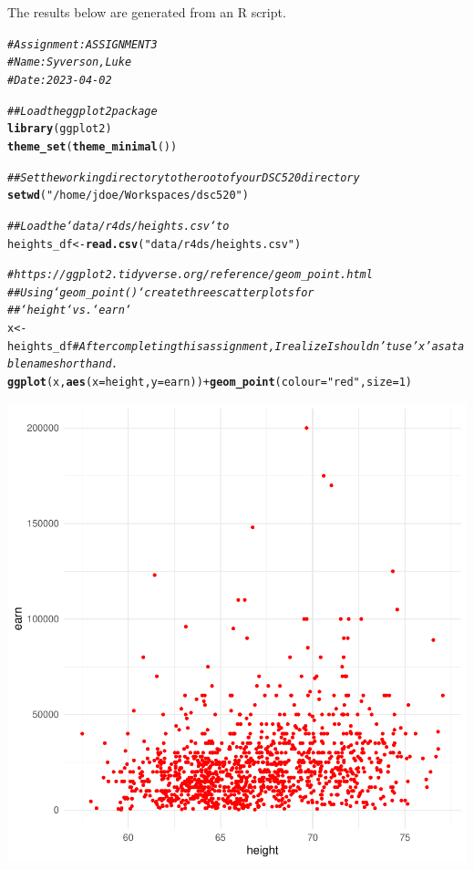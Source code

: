 \documentclass{article}\usepackage[]{graphicx}\usepackage[]{xcolor}
\makeatletter
\newcommand{\hlnum}[1]{\textcolor[rgb]{0.686,0.059,0.569}{#1}}%
\newcommand{\hlstr}[1]{\textcolor[rgb]{0.192,0.494,0.8}{#1}}%
\newcommand{\hlcom}[1]{\textcolor[rgb]{0.678,0.584,0.686}{\textit{#1}}}%
\newcommand{\hlopt}[1]{\textcolor[rgb]{0,0,0}{#1}}%
\newcommand{\hlstd}[1]{\textcolor[rgb]{0.345,0.345,0.345}{#1}}%
\newcommand{\hlkwb}[1]{\textcolor[rgb]{0.69,0.353,0.396}{#1}}%
\newcommand{\hlkwc}[1]{\textcolor[rgb]{0.333,0.667,0.333}{#1}}%
\newcommand{\hlkwd}[1]{\textcolor[rgb]{0.737,0.353,0.396}{\textbf{#1}}}%
\newenvironment{kframe}{%
 \def\at@end@of@kframe{}%
 \ifinner\ifhmode%
  \def\at@end@of@kframe{\end{minipage}}%
  \begin{minipage}{\columnwidth}%
 \fi\fi%
 \def\FrameCommand##1{\hskip\@totalleftmargin \hskip-\fboxsep
 \colorbox{shadecolor}{##1}\hskip-\fboxsep
     \hskip-\linewidth \hskip-\@totalleftmargin \hskip\columnwidth}%
 \MakeFramed {\advance\hsize-\width
   \@totalleftmargin\z@ \linewidth\hsize
   \@setminipage}}%
 {\par\unskip\endMakeFramed%
 \at@end@of@kframe}
\newenvironment{knitrout}{}{} %
\makeatother
\begin{document}
\title{\title{}}



\maketitle
The results below are generated from an R script.

\begin{knitrout}
\color{fgcolor}\begin{kframe}
\begin{alltt}
\hlcom{# Assignment: ASSIGNMENT 3}
\hlcom{# Name: Syverson, Luke}
\hlcom{# Date: 2023-04-02}

\hlcom{## Load the ggplot2 package}
\hlkwd{library}\hlstd{(ggplot2)}
\hlkwd{theme_set}\hlstd{(}\hlkwd{theme_minimal}\hlstd{())}

\hlcom{## Set the working directory to the root of your DSC 520 directory}
\hlkwd{setwd}\hlstd{(}\hlstr{"/home/jdoe/Workspaces/dsc520"}\hlstd{)}
\end{alltt}


{\ttfamily\noindent\bfseries{}}\begin{alltt}
\hlcom{## Load the `data/r4ds/heights.csv` to}
\hlstd{heights_df} \hlkwb{<-} \hlkwd{read.csv}\hlstd{(}\hlstr{"data/r4ds/heights.csv"}\hlstd{)}

\hlcom{# https://ggplot2.tidyverse.org/reference/geom_point.html}
\hlcom{## Using `geom_point()` create three scatterplots for}
\hlcom{## `height` vs. `earn`}
\hlstd{x} \hlkwb{<-} \hlstd{heights_df} \hlcom{# After completing this assignment, I realize I shouldn't use 'x' as a table name shorthand.}
\hlkwd{ggplot}\hlstd{(x,} \hlkwd{aes}\hlstd{(}\hlkwc{x}\hlstd{=height,} \hlkwc{y}\hlstd{=earn))} \hlopt{+} \hlkwd{geom_point}\hlstd{(}\hlkwc{colour} \hlstd{=} \hlstr{"red"}\hlstd{,} \hlkwc{size} \hlstd{=} \hlnum{1}\hlstd{)}
\end{alltt}
\end{kframe}

{\centering \includegraphics[width=.6\linewidth]{figure/assignment-03-SyversonLuke-Rnwauto-report-1} 

}
\end{knitrout}
\end{document}
